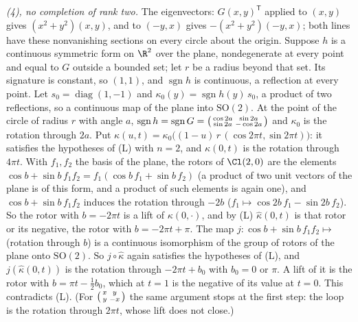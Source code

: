 \emph{(4), no completion of rank two.} The eigenvectors: $G(x,y)^{\mathsf T}$ applied to $(x,y)$ gives $(x^{2} + y^{2})(x,y)$, and to $(-y,x)$ gives $-(x^{2} + y^{2})(-y,x)$; both lines have these nonvanishing sections on every circle about the origin. Suppose $h$ is a continuous symmetric form on $\R^{2}$ over the plane, nondegenerate at every point and equal to $G$ outside a bounded set; let $r$ be a radius beyond that set. Its signature is constant, so $(1,1)$, and $\operatorname{sgn} h$ is continuous, a reflection at every point. Let $s_{0} = \operatorname{diag}(1,-1)$ and $\kappa_{0}(y) = \operatorname{sgn} h(y)\,s_{0}$, a product of two reflections, so a continuous map of the plane into $\mathrm{SO}(2)$. At the point of the circle of radius $r$ with angle $a$, $\operatorname{sgn} h = \operatorname{sgn} G = \begin{psmallmatrix} \cos 2a & \sin 2a \\ \sin 2a & -\cos 2a\end{psmallmatrix}$ and $\kappa_{0}$ is the rotation through $2a$. Put $\kappa(u,t) = \kappa_{0}\bigl((1-u)\,r\,(\cos 2\pi t, \sin 2\pi t)\bigr)$: it satisfies the hypotheses of (L) with $n = 2$, and $\kappa(0,t)$ is the rotation through $4\pi t$. With $f_{1}, f_{2}$ the basis of the plane, the rotors of $\Cl(2,0)$ are the elements $\cos b + \sin b\,f_{1}f_{2} = f_{1}(\cos b\,f_{1} + \sin b\,f_{2})$ (a product of two unit vectors of the plane is of this form, and a product of such elements is again one), and $\cos b + \sin b\,f_{1}f_{2}$ induces the rotation through $-2b$ ($f_{1} \mapsto \cos 2b\,f_{1} - \sin 2b\,f_{2}$). So the rotor with $b = -2\pi t$ is a lift of $\kappa(0,\cdot)$, and by (L) $\hat\kappa(0,t)$ is that rotor or its negative, the rotor with $b = -2\pi t + \pi$. The map $j \colon \cos b + \sin b\,f_{1}f_{2} \mapsto$ (rotation through $b$) is a continuous isomorphism of the group of rotors of the plane onto $\mathrm{SO}(2)$. So $j \circ \hat\kappa$ again satisfies the hypotheses of (L), and $j(\hat\kappa(0,t))$ is the rotation through $-2\pi t + b_{0}$ with $b_{0} = 0$ or $\pi$. A lift of it is the rotor with $b = \pi t - \tfrac12 b_{0}$, which at $t = 1$ is the negative of its value at $t = 0$. This contradicts (L). (For $\begin{psmallmatrix} x & y \\ y & -x\end{psmallmatrix}$ the same argument stops at the first step: the loop is the rotation through $2\pi t$, whose lift does not close.)

